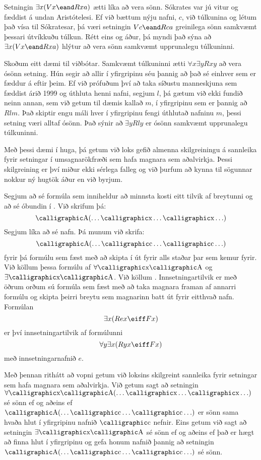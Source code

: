 Setningin $\exists x (Vx \eand Rxa)$ ætti líka að vera sönn. Sókrates var jú vitur og fæddist á undan Aristótelesi. Ef við bættum nýju nafni, $c$, við túlkunina og létum það vísa til Sókratesar, þá væri setningin $Vc \eand Rca$ greinilega sönn samkvæmt þessari útvíkkuðu túlkun. Rétt eins og áður, þá myndi það sýna að $\exists x (Vx \eand Rxa)$ hlýtur að vera sönn samkvæmt upprunalegu túlkuninni.

Skoðum eitt dæmi til viðbótar. Samkvæmt túlkuninni ætti $\forall x \exists y Rxy$ að vera ósönn setning. Hún segir að allir í yfirgripinu séu þannig að það sé einhver sem er fæddur á eftir þeim. Ef við prófuðum því að taka síðustu manneskjuna sem fæddist árið 1999 og úthluta henni nafni, segjum $l$, þá gætum við ekki fundið neinn annan, sem við getum til dæmis kallað $m$, í yfirgripinu sem er þannig að $Rlm$. Það skiptir engu máli hver í yfirgripinu fengi úthlutað nafninu $m$, þessi setning væri alltaf ósönn. Það sýnir að $\exists y Rly$ er ósönn samkvæmt upprunalegu túlkuninni.

Með þessi dæmi í huga, þá getum við loks gefið almenna skilgreiningu á sannleika fyrir setningar í umsagnarökfræði sem hafa magnara sem aðalvirkja. Þessi skilgreining er því miður ekki sérlega falleg og við þurfum að kynna til sögunnar nokkur ný hugtök áður en við byrjum. 

Segjum að  sé formúla sem inniheldur að minnsta kosti eitt tilvik af breytunni  og að  sé óbundin í . Við skrifum þá:
$$\meta{A}(\ldots \meta{x} \ldots \meta{x} \ldots)$$
Segjum líka að  sé nafn. Þá munum við skrifa:
$$\meta{A}(\ldots \meta{c} \ldots \meta{c} \ldots)$$
fyrir þá formúlu sem fæst með að skipta  í  út fyrir  alls staðar þar sem  kemur fyrir. Við köllum þessa formúlu  af $\forall \meta{x}\meta{A}$ og $\exists\meta{x}\meta{A}$. Við köllum  . Innsetningartilvik er með öðrum orðum sú formúla sem fæst með að taka magnara framan af annarri formúlu og skipta þeirri breytu sem magnarinn batt út fyrir eitthvað nafn. Formúlan
	$$\exists x (Rex \eiff Fx)$$
er því innsetningartilvik af formúlunni
	$$\forall y \exists x (Ryx \eiff Fx)$$
með innsetningarnafnið $e$.

Með þennan rithátt að vopni getum við loksins skilgreint sannleika fyrir setningar sem hafa magnara sem aðalvirkja. Við getum sagt að setningin $\forall \meta{x}\meta{A}(\ldots \meta{x} \ldots \meta{x} \ldots)$ sé sönn ef og aðeins ef $\meta{A}(\ldots \meta{c} \ldots \meta{c}\ldots)$ er sönn sama hvaða hlut í yfirgripinu nafnið $\meta{c}$ nefnir. Eins getum við sagt að setningin $\exists \meta{x}\meta{A}$ sé sönn ef og aðeins ef það er hægt að finna hlut í yfirgripinu og gefa honum nafnið  þannig að setningin $\meta{A}(\ldots \meta{c} \ldots \meta{c} \ldots)$ sé sönn.

